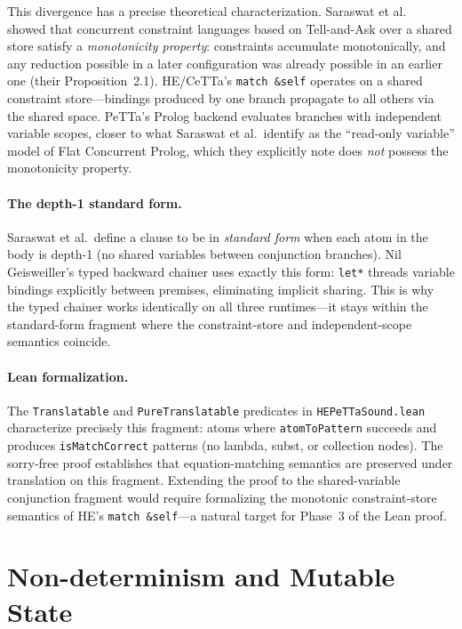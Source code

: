 \documentclass[11pt]{article}
\newcommand{\code}[1]{\texttt{#1}}
\newcommand{\PeTTa}{\textup{PeTTa}}
\newcommand{\HE}{\textup{HE}}
\newcommand{\CeTTa}{\textup{CeTTa}}
\begin{document}
This divergence has a precise theoretical characterization.
Saraswat et al.~\cite{saraswat1988} showed that concurrent constraint
languages based on Tell-and-Ask over a shared store satisfy a
\emph{monotonicity property}: constraints accumulate monotonically,
and any reduction possible in a later configuration was already
possible in an earlier one (their Proposition~2.1).  \HE{}/\CeTTa{}'s
\code{match~\&self} operates on a shared constraint store---bindings
produced by one branch propagate to all others via the shared space.
\PeTTa{}'s Prolog backend evaluates branches with independent variable
scopes, closer to what Saraswat et al.\ identify as the
``read-only variable'' model of Flat Concurrent Prolog, which they
explicitly note does \emph{not} possess the monotonicity property.

\paragraph{The depth-1 standard form.}
Saraswat et al.\ define a clause to be in \emph{standard form} when
each atom in the body is depth-1 (no shared variables between
conjunction branches).  Nil Geisweiller's typed backward chainer
uses exactly this form: \code{let*} threads variable bindings
explicitly between premises, eliminating implicit sharing.  This is
why the typed chainer works identically on all three runtimes---it
stays within the standard-form fragment where the constraint-store
and independent-scope semantics coincide.

\paragraph{Lean formalization.}
The \code{Translatable} and \code{PureTranslatable} predicates in
\code{HEPeTTaSound.lean} characterize precisely this fragment: atoms
where \code{atomToPattern} succeeds and produces
\code{isMatchCorrect} patterns (no lambda, subst, or collection
nodes).  The sorry-free proof establishes that equation-matching
semantics are preserved under translation on this fragment.  Extending
the proof to the shared-variable conjunction fragment would require
formalizing the monotonic constraint-store semantics of \HE{}'s
\code{match~\&self}---a natural target for Phase~3 of the Lean proof.

\section{Non-determinism and Mutable State}
\label{sec:nondet-state}
\end{document}
